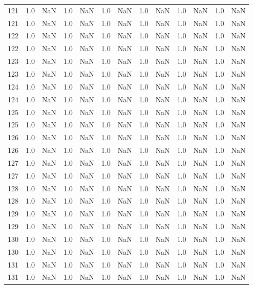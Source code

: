 \begin{tabular}{lrrrrrrrrrrrr}
121 & 1.0 & NaN & 1.0 & NaN & 1.0 & NaN & 1.0 & NaN & 1.0 & NaN & 1.0 & NaN \\
121 & 1.0 & NaN & 1.0 & NaN & 1.0 & NaN & 1.0 & NaN & 1.0 & NaN & 1.0 & NaN \\
122 & 1.0 & NaN & 1.0 & NaN & 1.0 & NaN & 1.0 & NaN & 1.0 & NaN & 1.0 & NaN \\
122 & 1.0 & NaN & 1.0 & NaN & 1.0 & NaN & 1.0 & NaN & 1.0 & NaN & 1.0 & NaN \\
123 & 1.0 & NaN & 1.0 & NaN & 1.0 & NaN & 1.0 & NaN & 1.0 & NaN & 1.0 & NaN \\
123 & 1.0 & NaN & 1.0 & NaN & 1.0 & NaN & 1.0 & NaN & 1.0 & NaN & 1.0 & NaN \\
124 & 1.0 & NaN & 1.0 & NaN & 1.0 & NaN & 1.0 & NaN & 1.0 & NaN & 1.0 & NaN \\
124 & 1.0 & NaN & 1.0 & NaN & 1.0 & NaN & 1.0 & NaN & 1.0 & NaN & 1.0 & NaN \\
125 & 1.0 & NaN & 1.0 & NaN & 1.0 & NaN & 1.0 & NaN & 1.0 & NaN & 1.0 & NaN \\
125 & 1.0 & NaN & 1.0 & NaN & 1.0 & NaN & 1.0 & NaN & 1.0 & NaN & 1.0 & NaN \\
126 & 1.0 & NaN & 1.0 & NaN & 1.0 & NaN & 1.0 & NaN & 1.0 & NaN & 1.0 & NaN \\
126 & 1.0 & NaN & 1.0 & NaN & 1.0 & NaN & 1.0 & NaN & 1.0 & NaN & 1.0 & NaN \\
127 & 1.0 & NaN & 1.0 & NaN & 1.0 & NaN & 1.0 & NaN & 1.0 & NaN & 1.0 & NaN \\
127 & 1.0 & NaN & 1.0 & NaN & 1.0 & NaN & 1.0 & NaN & 1.0 & NaN & 1.0 & NaN \\
128 & 1.0 & NaN & 1.0 & NaN & 1.0 & NaN & 1.0 & NaN & 1.0 & NaN & 1.0 & NaN \\
128 & 1.0 & NaN & 1.0 & NaN & 1.0 & NaN & 1.0 & NaN & 1.0 & NaN & 1.0 & NaN \\
129 & 1.0 & NaN & 1.0 & NaN & 1.0 & NaN & 1.0 & NaN & 1.0 & NaN & 1.0 & NaN \\
129 & 1.0 & NaN & 1.0 & NaN & 1.0 & NaN & 1.0 & NaN & 1.0 & NaN & 1.0 & NaN \\
130 & 1.0 & NaN & 1.0 & NaN & 1.0 & NaN & 1.0 & NaN & 1.0 & NaN & 1.0 & NaN \\
130 & 1.0 & NaN & 1.0 & NaN & 1.0 & NaN & 1.0 & NaN & 1.0 & NaN & 1.0 & NaN \\
131 & 1.0 & NaN & 1.0 & NaN & 1.0 & NaN & 1.0 & NaN & 1.0 & NaN & 1.0 & NaN \\
131 & 1.0 & NaN & 1.0 & NaN & 1.0 & NaN & 1.0 & NaN & 1.0 & NaN & 1.0 & NaN \\

\end{tabular}
